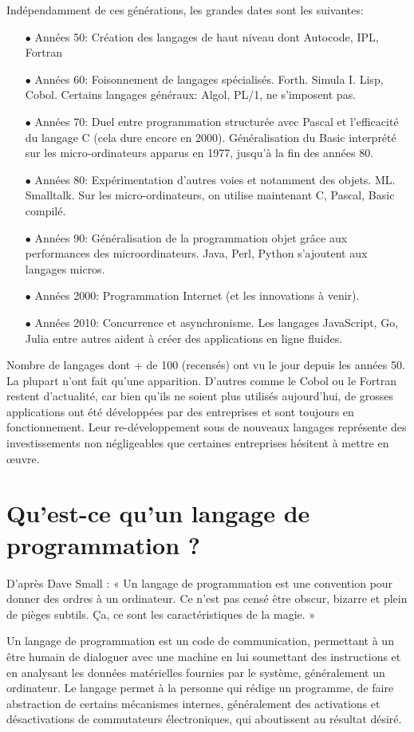 \documentclass[a4paper,12pt]{article} %
\begin{document}
 Indépendamment de ces générations, les grandes dates sont les suivantes:
 \begin{itemize}
\item[$\bullet$] Années 50: Création des langages de haut niveau dont Autocode, IPL, Fortran
\item[$\bullet$] Années 60: Foisonnement de langages spécialisés. Forth. Simula I. Lisp, Cobol.
Certains langages généraux: Algol, PL/1, ne s’imposent pas.
\item[$\bullet$] Années 70: Duel entre programmation structurée avec Pascal et l'efficacité du langage C
 (cela dure encore en 2000). Généralisation du Basic interprété sur les micro-ordinateurs
apparus en 1977, jusqu'à la fin des années 80.
\item[$\bullet$] Années 80: Expérimentation d'autres voies et notamment des objets. ML. Smalltalk. Sur les
micro-ordinateurs, on utilise maintenant C, Pascal, Basic compilé.
\item[$\bullet$] Années 90: Généralisation de la programmation objet grâce aux performances des microordinateurs. Java, Perl, Python s'ajoutent aux langages micros.
\item[$\bullet$] Années 2000: Programmation Internet (et les innovations à venir).
\item[$\bullet$] Années 2010: Concurrence et asynchronisme. Les langages JavaScript, Go, Julia entre autres
aident à créer des applications en ligne fluides.
\end{itemize}

Nombre de langages dont + de 100 (recensés) ont vu le jour depuis les années 50. La plupart n’ont fait qu’une apparition. D’autres comme le Cobol ou le Fortran restent d’actualité, car bien qu’ils ne soient plus utilisés aujourd’hui, de grosses applications ont été développées par des entreprises et sont toujours en fonctionnement. Leur re-développement sous de nouveaux langages représente des investissements non négligeables que certaines entreprises hésitent à mettre en œuvre.

\section{Qu’est-ce qu’un langage de programmation ?} %
D’après Dave Small : « Un langage de programmation est une convention pour donner des ordres à un ordinateur. Ce n’est pas censé être obscur, bizarre et plein de pièges subtils. Ça, ce sont les caractéristiques de la magie. »

Un langage de programmation est un code de communication, permettant à un être humain de dialoguer avec une machine en lui soumettant des instructions et en analysant les données matérielles fournies par le système, généralement un ordinateur. Le langage permet à la personne qui rédige un programme, de faire abstraction de certains mécanismes internes, généralement des activations et désactivations de commutateurs électroniques, qui aboutissent au résultat désiré.
\end{document}
